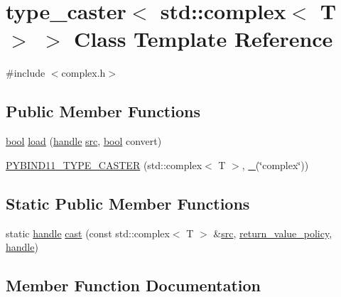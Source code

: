 \hypertarget{classtype__caster_3_01std_1_1complex_3_01_t_01_4_01_4}{}\section{type\+\_\+caster$<$ std\+::complex$<$ T $>$ $>$ Class Template Reference}
\label{classtype__caster_3_01std_1_1complex_3_01_t_01_4_01_4}


{\ttfamily \#include $<$complex.\+h$>$}

\subsection*{Public Member Functions}
\begin{DoxyCompactItemize}
\item 
\mbox{\hyperlink{asdl_8h_af6a258d8f3ee5206d682d799316314b1}{bool}} \mbox{\hyperlink{classtype__caster_3_01std_1_1complex_3_01_t_01_4_01_4_a0358066accceb09dc3e88f9a50f0fb00}{load}} (\mbox{\hyperlink{classhandle}{handle}} \mbox{\hyperlink{_s_d_l__opengl__glext_8h_a72e0fdf0f845ded60b1fada9e9195cd7}{src}}, \mbox{\hyperlink{asdl_8h_af6a258d8f3ee5206d682d799316314b1}{bool}} convert)
\item 
\mbox{\hyperlink{classtype__caster_3_01std_1_1complex_3_01_t_01_4_01_4_a58b7128eed3564ae4060242f99c8dd61}{P\+Y\+B\+I\+N\+D11\+\_\+\+T\+Y\+P\+E\+\_\+\+C\+A\+S\+T\+ER}} (std\+::complex$<$ T $>$, \mbox{\hyperlink{descr_8h_af114703e20c6527e87163eb2798f74b8}{\+\_\+}}(\char`\"{}complex\char`\"{}))
\end{DoxyCompactItemize}
\subsection*{Static Public Member Functions}
\begin{DoxyCompactItemize}
\item 
static \mbox{\hyperlink{classhandle}{handle}} \mbox{\hyperlink{classtype__caster_3_01std_1_1complex_3_01_t_01_4_01_4_ae0a66f06eff200f0ea8105945f5e39de}{cast}} (const std\+::complex$<$ T $>$ \&\mbox{\hyperlink{_s_d_l__opengl__glext_8h_a72e0fdf0f845ded60b1fada9e9195cd7}{src}}, \mbox{\hyperlink{detail_2common_8h_adde72ab1fb0dd4b48a5232c349a53841}{return\+\_\+value\+\_\+policy}}, \mbox{\hyperlink{classhandle}{handle}})
\end{DoxyCompactItemize}


\subsection{Member Function Documentation}
\mbox{\label{classtype__caster_3_01std_1_1complex_3_01_t_01_4_01_4_ae0a66f06eff200f0ea8105945f5e39de}} 

